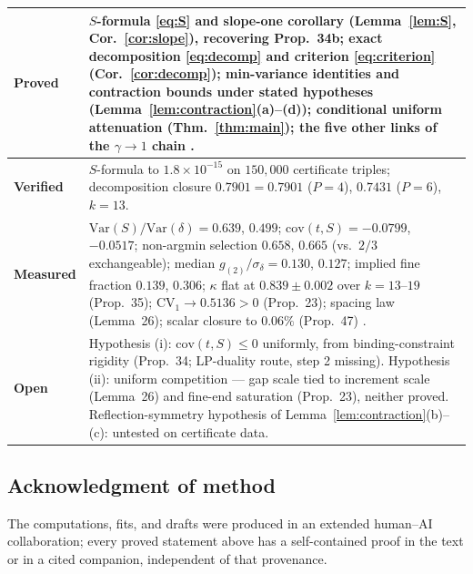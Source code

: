 \documentclass[11pt]{article}
\theoremstyle{definition}
\theoremstyle{remark}
\newcommand{\CV}{\mathrm{CV}}
\newcommand{\Var}{\mathrm{Var}}
\newcommand{\cov}{\mathrm{cov}}
\newcommand{\gam}{\gamma}
\newcommand{\kap}{\kappa}
\newcommand{\dl}{\delta}
\begin{document}
\begin{center}
\begin{tabular}{p{} p{}}
\hline
\textbf{Proved} &
$S$-formula \eqref{eq:S} and slope-one corollary
(Lemma~\ref{lem:S}, Cor.~\ref{cor:slope}), recovering Prop.~34b;
exact decomposition \eqref{eq:decomp} and criterion \eqref{eq:criterion}
(Cor.~\ref{cor:decomp});
min-variance identities and contraction bounds under stated hypotheses
(Lemma~\ref{lem:contraction}(a)--(d));
conditional uniform attenuation (Thm.~\ref{thm:main});
the five other links of the $\gam \to 1$ chain \cite{Temp26, Drift26,
Gamma26}. \\
\hline
\textbf{Verified} &
$S$-formula to $1.8 \times 10^{-15}$ on $150{,}000$ certificate triples;
decomposition closure $0.7901 = 0.7901$ ($P{=}4$), $0.7431$ ($P{=}6$),
$k = 13$. \\
\hline
\textbf{Measured} &
$\Var(S)/\Var(\dl) = 0.639$, $0.499$;
$\cov(t,S) = -0.0799$, $-0.0517$;
non-argmin selection $0.658$, $0.665$ (vs.\ $2/3$ exchangeable);
median $g_{(2)}/\sigma_\dl = 0.130$, $0.127$;
implied fine fraction $0.139$, $0.306$;
$\kap$ flat at $0.839 \pm 0.002$ over $k = 13$--$19$ (Prop.~35);
$\CV_1 \to 0.5136 > 0$ (Prop.~23); spacing law (Lemma~26);
scalar closure to $0.06\%$ (Prop.~47) \cite{NOTE}. \\
\hline
\textbf{Open} &
Hypothesis (i): $\cov(t,S) \leq 0$ uniformly, from binding-constraint
rigidity (Prop.~34; LP-duality route, step 2 missing).
Hypothesis (ii): uniform competition --- gap scale tied to increment
scale (Lemma~26) and fine-end saturation (Prop.~23), neither proved.
Reflection-symmetry hypothesis of
Lemma~\ref{lem:contraction}(b)--(c): untested on certificate data. \\
\hline
\end{tabular}
\end{center}

\subsection*{Acknowledgment of method}
The computations, fits, and drafts were produced in an extended
human--AI collaboration; every proved statement above has a
self-contained proof in the text or in a cited companion, independent of
that provenance.
\end{document}
